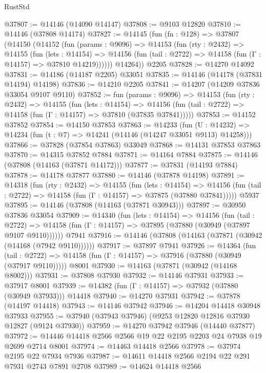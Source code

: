 \begin{lexlean}{RustStd}
\begin{coremodule}
@37807 := @14146 (@14090 @14147)
@37808 := @9103 @12820
@37810 := @14146 (@37808 @14174)
@37827 := @14145
    (fun (fn : @128) =>
    @37807
      (@14150
        (@14152
          (fun (params : @9096) =>
          @14153
            (fun (rty : @2432) =>
            @14155
              (fun (lets : @14154) =>
              @14156 (fun (tail : @2722) => @14158 (fun (Γ : @14157) => @37810 @14219))))))
        @14264))
    @2205
@37828 := @14270 @14092
@37831 := @14186 (@14187 @2205) @33051
@37835 := @14146 (@14178 (@37831 @14194) @14198)
@37836 := @14210 @2205
@37841 := @14207 (@14209 @37836 @33054 @9107 @9110)
@37852 := fun (params : @9096) =>
  @14153
    (fun (rty : @2432) =>
    @14155
      (fun (lets : @14154) =>
      @14156 (fun (tail : @2722) => @14158 (fun (Γ : @14157) => @37810 (@37835 @37841)))))
@37853 := @14152 @37852
@37854 := @14150 @37853
@37863 := @14233
    (fun (U : @14232) => @14234 (fun (t : @7) => @14241 (@14146 (@14247 @33051 @9113) @14258)))
@37866 := @37828 (@37854 @37863) @33049
@37868 := @14131 @37853 @37863
@37870 := @14315 @37852 @7884
@37871 := @14164 @7884
@37875 := @14146 (@37808 (@14163 (@37871 @14172)))
@37877 := @37831 (@14193 @7884)
@37878 := @14178 @37877
@37880 := @14146 (@37878 @14198)
@37891 := @14318
    (fun (rty : @2432) =>
    @14155
      (fun (lets : @14154) =>
      @14156 (fun (tail : @2722) => @14158 (fun (Γ : @14157) => @37875 (@37880 @37841)))))
    @5937
@37895 := @14146 (@37808 (@14163 (@37871 @30943)))
@37897 := @30950 @37836 @33054
@37909 := @14340
    (fun (lets : @14154) =>
    @14156
      (fun (tail : @2722) =>
      @14158 (fun (Γ : @14157) => @37895 (@37880 (@30949 (@37897 @9107 @9110))))))
    @7941
@37916 := @14146 (@37808 (@14163 (@37871 (@30942 (@14168 (@7942 @9110))))))
@37917 := @37897 @7941
@37926 := @14364
    (fun (tail : @2722) => @14158 (fun (Γ : @14157) => @37916 (@37880 (@30949 (@37917 @9110)))))
    @8001
@37930 := @14163 (@37871 (@30942 (@14168 @8002)))
@37931 := @37808 @37930
@37932 := @14146 @37931
@37933 := @37917 @8001
@37939 := @14382 (fun (Γ : @14157) => @37932 (@37880 (@30949 @37933))) @14418
@37940 := @14270 @37931
@37942 := @37878 (@14197 @14418)
@37943 := @14146 @37942
@37946 := @14204 @14418 @30948 @37933
@37955 := @37940 (@37943 @37946) (@9253 @12820 @12816 @37930 @12827 (@9124 @37930))
@37959 := @14270 @37942 @37946 (@14440 @37877)
@37972 := @14446 @14418 @2566 @2566 @19 @22 @2195 @2203 @24 @7938 @19 @2699 @2714 @8001
@37974 := @14463 @14418 @2566
@37978 := @37974 @2195 @22 @7934 @7936
@37987 := @14611 @14418 @2566 @2194 @22 @291 @7931 @2743 @7891 @2708
@37989 := @14624 @14418 @2566

\end{coremodule}
\end{lexlean}
